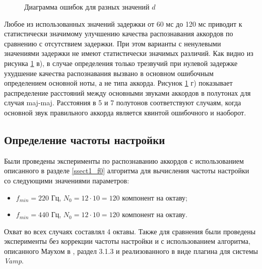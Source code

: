 \begin{figure}[h]
  \begin{minipage}[h]{0.49\linewidth}
  \end{minipage}
  \hfill
  \begin{minipage}[h]{0.49\linewidth}
  \end{minipage}
  \hfill
  \begin{minipage}[h]{0.49\linewidth}
  \end{minipage}
  \hfill
  \begin{minipage}[h]{0.49\linewidth}
  \end{minipage}
  \caption{Диаграмма ошибок для разных значений $d$}
  \label{img:offset}
\end{figure}

Любое из использованных значений задержки от 60 мс до 120 мс приводит к
статистически значимому улучшению качества распознавания аккордов по сравнению
с отсутствием задержки. При этом варианты с ненулевыми значениями задержки не
имеют статистически значимых различий. Как видно из рисунка \ref{img:offset} в),
в случае определения только трезвучий при нулевой задержке ухудшение качества
распознавания вызвано в основном ошибочным определением основной ноты, а не
типа аккорда. Рисунок \ref{img:offset} г) показывает распределение расстояний
между основными звуками аккордов в полутонах для случая maj-maj. Расстояния в 5
и 7 полутонов соответствуют случаям, когда основной звук правильного аккорда
является квинтой ошибочного и наоборот.

\subsection{Определение частоты настройки} \label{ssec3_tunfreq}

Были проведены эксперименты по распознаванию аккордов с использованием
описанного в разделе \ref{ssect1_f0} алгоритма для вычисления частоты настройки
со следующими значениями параметров:
\begin{itemize}
  \item $f_{min} = 220$ Гц, $N_0 = 12 \cdot 10 = 120$ компонент на октаву;
  \item $f_{min} = 440$ Гц, $N_0 = 12 \cdot 10 = 120$ компонент на октаву.
\end{itemize}
Охват во всех случаях составлял 4 октавы. Также для сравнения были проведены
эксперименты без коррекции частоты настройки и с использованием алгоритма,
описанного Маухом в \cite{MauchThesis2010}, раздел 3.1.3 и реализованного в виде
плагина для системы \emph{Vamp}.

